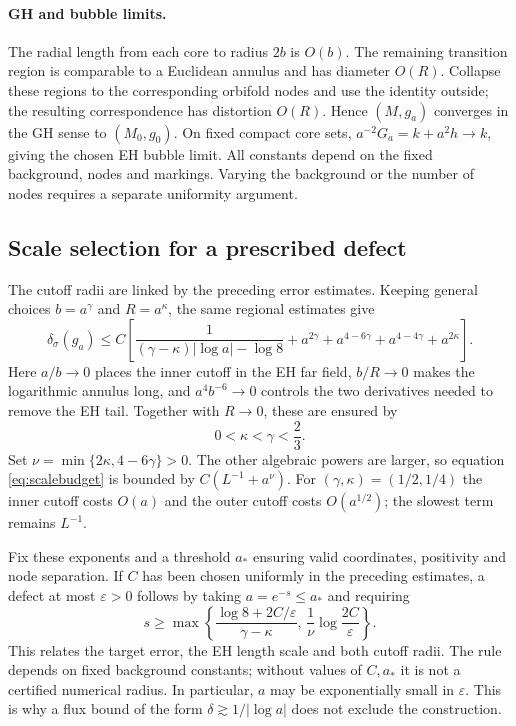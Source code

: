 \documentclass[a4paper,11pt]{article}
\numberwithin{equation}{section}
\theoremstyle{definition}
\begin{document}
\paragraph{GH and bubble limits.}
The radial length from each core to radius $2b$ is $O(b)$.
The remaining transition region is comparable to a Euclidean annulus and has diameter $O(R)$.
Collapse these regions to the corresponding orbifold nodes and use the identity outside; the resulting correspondence has distortion $O(R)$.
Hence $(M,g_a)$ converges in the GH sense to $(M_0,g_0)$.
On fixed compact core sets, $a^{-2}G_a=k+a^2h\to k$, giving the chosen EH bubble limit.
All constants depend on the fixed background, nodes and markings. Varying the background or the number of nodes requires a separate uniformity argument.

\subsection{Scale selection for a prescribed defect}\label{sec:scalechoice}
The cutoff radii are linked by the preceding error estimates. Keeping general choices
$b=a^\gamma$ and $R=a^\kappa$, the same regional estimates give
\begin{equation}\label{eq:scalebudget}
\delta_\sigma(g_a)\le C\left[
\frac1{(\gamma-\kappa)|\log a|-\log8}
+a^{2\gamma}+a^{4-6\gamma}+a^{4-4\gamma}+a^{2\kappa}\right].
\end{equation}
Here $a/b\to0$ places the inner cutoff in the EH far field, $b/R\to0$ makes the logarithmic annulus long,
and $a^4b^{-6}\to0$ controls the two derivatives needed to remove the EH tail.
Together with $R\to0$, these are ensured by
\[
0<\kappa<\gamma<\frac23.
\]
Set $\nu=\min\{2\kappa,4-6\gamma\}>0$. The other algebraic powers are larger,
so equation \eqref{eq:scalebudget} is bounded by $C(L^{-1}+a^\nu)$.
For $(\gamma,\kappa)=(1/2,1/4)$ the inner cutoff costs $O(a)$ and the outer cutoff
costs $O(a^{1/2})$; the slowest term remains $L^{-1}$.

Fix these exponents and a threshold $a_*$ ensuring valid coordinates, positivity and node separation.
If $C$ has been chosen uniformly in the preceding estimates, a defect at most $\varepsilon>0$ follows by taking
$a=e^{-s}\le a_*$ and requiring
\begin{equation}\label{eq:targetscale}
s\ge\max\left\{
\frac{\log8+2C/\varepsilon}{\gamma-\kappa},\,
\frac1\nu\log\frac{2C}{\varepsilon}\right\}.
\end{equation}
This relates the target error, the EH length scale and both cutoff radii.
The rule depends on fixed background constants; without values of $C,a_*$ it is not a certified numerical radius.
In particular, $a$ may be exponentially small in $\varepsilon$. This is why a flux bound of the form
$\delta\gtrsim1/|\log a|$ does not exclude the construction.
\end{document}
